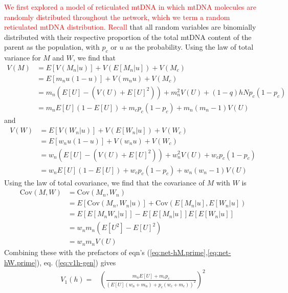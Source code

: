 \documentclass{article}
\begin{document}
\begin{appendices}
\textcolor{red}{We first explored a model of reticulated mtDNA in which mtDNA molecules are randomly distributed throughout the network, which we term a random reticulated mtDNA distribution. Recall} that all random variables are binomially distributed with their respective proportion of the total mtDNA content of the parent as the population, with $p_c$ or $u$ as the probability. Using the law of total variance for $M$ and $W$, we find that
\begin{equation}\label{eq:app-vm-net}
    \begin{split}
   V(M) & = E[V(M_n|u)]+V(E[M_n|u])+V(M_c)\\
        & = E[m_nu(1-u)]+V(m_nu)+V(M_c)\\
        & = m_n(E[U]-(V(U)+E[U]^2))+m_n^2V(U)+(1-q)hNp_c(1-p_c)\\
        & = m_nE[U](1-E[U])+m_cp_c(1-p_c)+m_n(m_n-1)V(U)
    \end{split}
\end{equation}
and
\begin{equation}\label{eq:app-vw-net}
    \begin{split}
   V(W) & = E[V(W_n|u)]+V(E[W_n|u])+V(W_c)\\
        & = E[w_nu(1-u)]+V(w_nu)+V(W_c)\\
        & = w_n(E[U]-(V(U)+E[U]^2))+w_n^2V(U)+w_cp_c(1-p_c)\\
        & = w_nE[U](1-E[U])+w_cp_c(1-p_c)+w_n(w_n-1)V(U)
    \end{split}
\end{equation}
Using the law of total covariance, we find that the covariance of $M$ with $W$ is
\begin{equation}\label{eq:app-cmw-net}
    \begin{split}
  \mathrm{Cov}(M,W) & = \mathrm{Cov}(M_n,W_n) \\
    & = E[\mathrm{Cov}(M_n,W_n|u)]+\mathrm{Cov}(E[M_n|u],E[W_n|u])\\ 
    & = E[E[M_nW_n|u]]-E[E[M_n|u]]E[E[W_n|u]]\\
    & = w_nm_n(E[U^2]-E[U]^2)\\
    & = w_nm_nV(U)
    \end{split}
\end{equation}
Combining these with the prefactors of eqn's (\ref{eq:net-hM.prime},\ref{eq:net-hW.prime}), eq. (\ref{eq:v1h-gen}) gives
\begin{equation}
    \begin{split}
    V_1(h)= &\left(\frac{m_nE[U]+m_cp_c}{(E[U](w_n+m_n)+p_c(w_c+m_c))^2}\right)^2

\end{split}
\end{equation}
\end{appendices}
\end{document}
